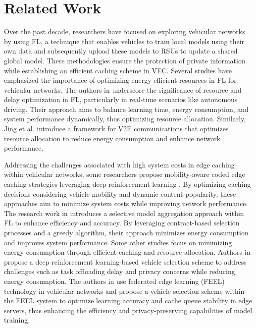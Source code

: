 \documentclass[journal]{IEEEtran}
\begin{document}
\section{Related Work}
Over the past decade, researchers have focused on exploring vehicular networks by using FL, a technique that enables vehicles to train local models using their own data and subsequently upload these models to RSUs to update a shared global model. These methodologies ensure the protection of private information while establishing an efficient caching scheme in VEC. 
Several studies have emphasized the importance of optimizing energy-efficient resources in FL for vehicular networks. The authors in \cite{Xiao2022-zg} underscore the significance of resource and delay optimization in FL, particularly in real-time scenarios like autonomous driving. Their approach aims to balance learning time, energy consumption, and system performance dynamically, thus optimizing resource allocation. Similarly, Jing et al. \cite{Wu2021-ux} introduce a framework for V2E communications that optimizes resource allocation to reduce energy consumption and enhance network performance.\par
Addressing the challenges associated with high system costs in edge caching within vehicular networks, some researchers propose mobility-aware coded edge caching strategies leveraging deep reinforcement learning \cite{r3}. By optimizing caching decisions considering vehicle mobility and dynamic content popularity, these approaches aim to minimize system costs while improving network performance. The research work in  \cite{r4} introduces a selective model aggregation approach within FL to enhance efficiency and accuracy. By leveraging contract-based selection processes and a greedy algorithm, their approach minimizes energy consumption and improves system performance. Some other studies focus on minimizing energy consumption through efficient caching and resource allocation. Authors in  \cite{r5} propose a deep reinforcement learning-based vehicle selection scheme to address challenges such as task offloading delay and privacy concerns while reducing energy consumption. The authors in  \cite{r6} use federated edge learning (FEEL) technology in vehicular networks and propose a vehicle selection scheme within the FEEL system to optimize learning accuracy and cache queue stability in edge servers, thus enhancing the efficiency and privacy-preserving capabilities of model training.\par
\end{document}
